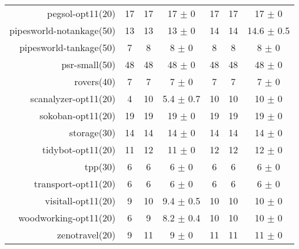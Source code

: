\begin{center}
\begin{tabular}{|r|*{2}{ccc|}}
pegsol-opt11(20) & 17 & 17 & 17 \(\pm\) 0 & 17 & 17 & 17 \(\pm\) 0\\
pipesworld-notankage(50) & 13 & 13 & 13 \(\pm\) 0 & 14 & 14 & 14.6 \(\pm\) 0.5\\
pipesworld-tankage(50) & 7 & 8 & 8 \(\pm\) 0 & 8 & 8 & 8 \(\pm\) 0\\
psr-small(50) & 48 & 48 & 48 \(\pm\) 0 & 48 & 48 & 48 \(\pm\) 0\\
rovers(40) & 7 & 7 & 7 \(\pm\) 0 & 7 & 7 & 7 \(\pm\) 0\\
scanalyzer-opt11(20) & 4 & 10 & 5.4 \(\pm\) 0.7 & 10 & 10 & 10 \(\pm\) 0\\
sokoban-opt11(20) & 19 & 19 & 19 \(\pm\) 0 & 19 & 19 & 19 \(\pm\) 0\\
storage(30) & 14 & 14 & 14 \(\pm\) 0 & 14 & 14 & 14 \(\pm\) 0\\
tidybot-opt11(20) & 11 & 12 & 11 \(\pm\) 0 & 12 & 12 & 12 \(\pm\) 0\\
tpp(30) & 6 & 6 & 6 \(\pm\) 0 & 6 & 6 & 6 \(\pm\) 0\\
transport-opt11(20) & 6 & 6 & 6 \(\pm\) 0 & 6 & 6 & 6 \(\pm\) 0\\
visitall-opt11(20) & 9 & 10 & 9.4 \(\pm\) 0.5 & 10 & 10 & 10 \(\pm\) 0\\
woodworking-opt11(20) & 6 & 9 & 8.2 \(\pm\) 0.4 & 10 & 10 & 10 \(\pm\) 0\\
zenotravel(20) & 9 & 11 & 9 \(\pm\) 0 & 11 & 11 & 11 \(\pm\) 0\\
\end{tabular}
\end{center}

